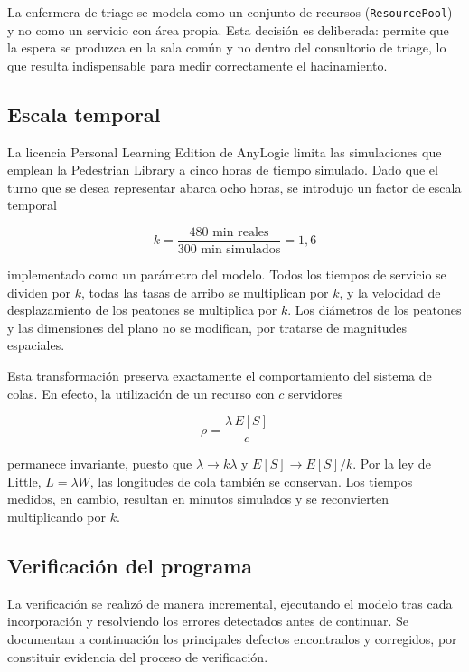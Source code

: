 La enfermera de triage se modela como un conjunto de recursos
(\texttt{ResourcePool}) y no como un servicio con área propia. Esta decisión
es deliberada: permite que la espera se produzca en la sala común y no dentro
del consultorio de triage, lo que resulta indispensable para medir
correctamente el hacinamiento.

\subsection{Escala temporal}
\label{sec:escala}

La licencia Personal Learning Edition de AnyLogic limita las simulaciones que
emplean la Pedestrian Library a cinco horas de tiempo simulado. Dado que el
turno que se desea representar abarca ocho horas, se introdujo un factor de
escala temporal

\[
k = \frac{480 \text{ min reales}}{300 \text{ min simulados}} = 1{,}6
\]

implementado como un parámetro del modelo. Todos los tiempos de servicio se
dividen por $k$, todas las tasas de arribo se multiplican por $k$, y la
velocidad de desplazamiento de los peatones se multiplica por $k$. Los
diámetros de los peatones y las dimensiones del plano no se modifican, por
tratarse de magnitudes espaciales.

Esta transformación preserva exactamente el comportamiento del sistema de
colas. En efecto, la utilización de un recurso con $c$ servidores

\[
\rho = \frac{\lambda\, E[S]}{c}
\]

permanece invariante, puesto que $\lambda \to k\lambda$ y
$E[S] \to E[S]/k$. Por la ley de Little, $L = \lambda W$, las longitudes de
cola también se conservan. Los tiempos medidos, en cambio, resultan en
minutos simulados y se reconvierten multiplicando por $k$.

\subsection{Verificación del programa}

La verificación se realizó de manera incremental, ejecutando el modelo tras
cada incorporación y resolviendo los errores detectados antes de continuar.
Se documentan a continuación los principales defectos encontrados y
corregidos, por constituir evidencia del proceso de verificación.

